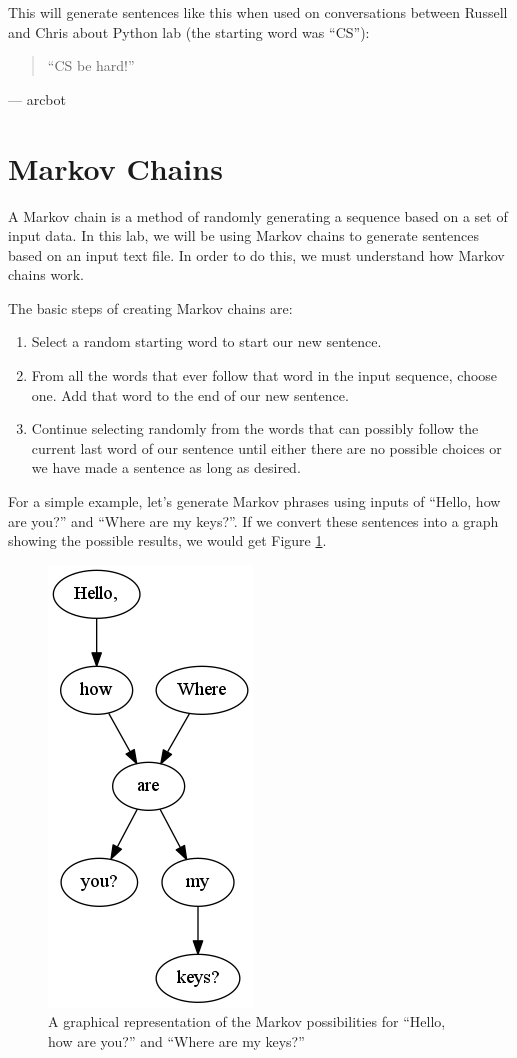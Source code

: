 \documentclass[11pt]{cselabheader}
\begin{document}
This will generate sentences like this when used on conversations between
Russell and Chris about Python lab (the starting word was ``CS''):
\begin{quotation}
``CS be hard!''
\end{quotation}
\begin{flushright}
--- arcbot
\end{flushright}
\pagebreak

\section{Markov Chains}
\label{sec:markov}

A Markov chain is a method of randomly generating a sequence based on a set of input data. In this lab, we will be using Markov chains to generate sentences based on an input text file. In order to do this, we must understand how Markov chains work.

The basic steps of creating Markov chains are:
\begin{enumerate}
\item Select a random starting word to start our new sentence.
\item From all the words that ever follow that word in the input sequence, choose one. Add that word to the end of our new sentence.
\item Continue selecting randomly from the words that can possibly follow the current last word of our sentence until either there are no possible choices or we have made a sentence as long as desired.
\end{enumerate}

For a simple example, let's generate Markov phrases using inputs of ``Hello, how are you?'' and ``Where are my keys?''. If we convert these sentences into a graph showing the possible results, we would get Figure \ref{mark_ex}.

\begin{figure}[h]
  \centering
  \includegraphics[width=0.2\linewidth]{lab10/example}
  \caption{A graphical representation of the Markov possibilities for ``Hello, how are you?'' and ``Where are my keys?''}
  \label{mark_ex}
\end{figure}
\end{document}

